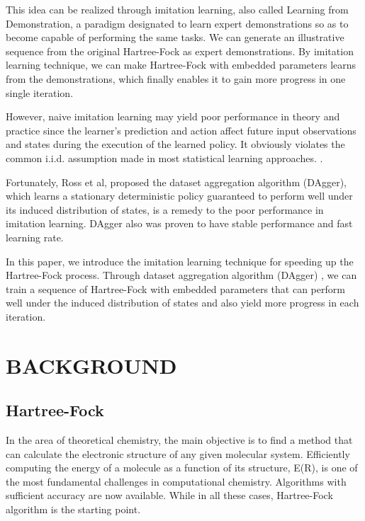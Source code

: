 \documentclass[twoside]{article}
\begin{document}
This idea can be realized through imitation learning, also called Learning from Demonstration, a paradigm designated to learn expert demonstrations so as to become capable of performing the same tasks. 
We can generate an illustrative sequence from the original Hartree-Fock as expert demonstrations. By imitation learning technique, we can make 
Hartree-Fock with embedded parameters learns from the demonstrations,  which finally enables it to gain more progress in one single iteration.


However, naive imitation learning may yield poor performance in theory and practice since the learner's prediction and action affect future input observations and states during the execution of the learned policy. It obviously violates the common i.i.d. assumption made in most statistical learning approaches. \cite{Ross}.


Fortunately, Ross et al,\cite{DAgger} proposed the dataset aggregation algorithm (DAgger), which learns a stationary deterministic policy guaranteed to perform well under its induced distribution of states, is a remedy to the poor performance in imitation learning. DAgger also was proven to have stable performance and fast learning rate. \cite{DAggerCompare}

In this paper,  we introduce the imitation learning technique for speeding up the Hartree-Fock process. 
Through dataset aggregation algorithm (DAgger) \cite{DAgger}, we can train a sequence of Hartree-Fock with embedded parameters that can perform well under the induced distribution of states and also yield more progress in each iteration. 



\section{BACKGROUND}

\subsection{Hartree-Fock}

In the area of theoretical chemistry, the main objective is to find a method that can calculate the electronic structure of any given molecular system. Efficiently computing the energy of a molecule as a function of its structure, E(R), is one of the most fundamental challenges in computational chemistry. Algorithms with sufficient accuracy are now available. While in all these cases, Hartree-Fock algorithm is the starting point.
\end{document}
